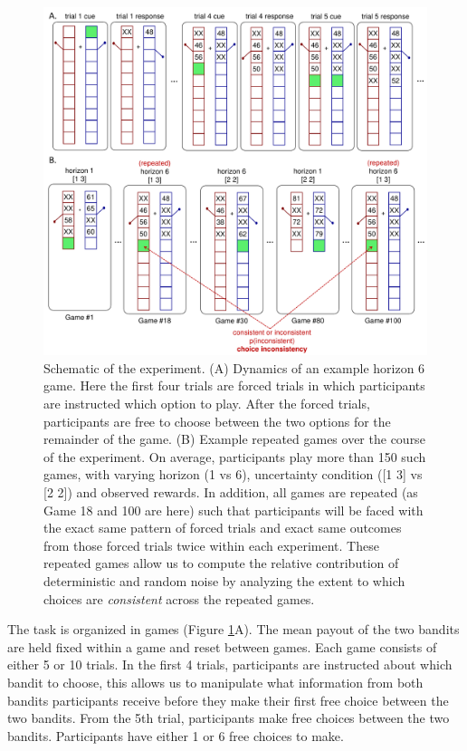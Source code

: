 \documentclass[12pt]{article}
\begin{document}
{	\begin{figure}[hp]
		\begin{center}
			\includegraphics[width=\textwidth]{figures/taskfiga.pdf}
			\caption{ 
				Schematic of the experiment. (A) Dynamics of an example horizon 6 game.  Here the first four trials are forced trials in which participants are instructed which option to play.  After the forced trials, participants are free to choose between the two options for the remainder of the game.  (B) Example repeated games over the course of the experiment.
				On average, participants play more than 150 such games, with varying horizon (1 vs 6), uncertainty condition ([1 3] vs [2 2]) and observed rewards.  In addition, all games are repeated (as Game 18 and 100 are here) such that participants will be faced with the exact same pattern of forced trials and exact same outcomes from those forced trials twice within each experiment.  These repeated games allow us to compute the relative contribution of deterministic and random noise by analyzing the extent to which choices are {\em consistent} across the repeated games.}
			\label{fig:taskfig}
		\end{center}
	\end{figure}
	
	The task is organized in games (Figure \ref{fig:taskfig}A). The mean payout of the two bandits are held fixed within a game and reset between games. Each game consists of either 5 or 10 trials. In the first 4 trials, participants are instructed about which bandit to choose, this allows us to manipulate what information from both bandits participants receive before they make their first free choice between the two bandits. From the 5th trial, participants make free choices between the two bandits. Participants have either 1 or 6 free choices to make. 
	
}
\end{document}
